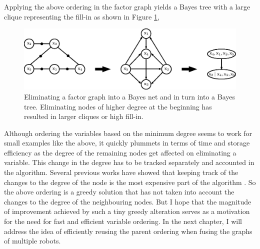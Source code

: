 Applying the above ordering in the factor graph yields a Bayes tree with a large clique representing the fill-in as shown in Figure \ref{fig:bad_ordering_graph},
\begin{figure}[H]
\centering
\includegraphics[width=\textwidth]{Chapters/figures2/bad_ordering}
\caption{Eliminating a factor graph into a Bayes net and in turn into a Bayes tree. Eliminating nodes of higher degree at the beginning has resulted in larger cliques or high fill-in.}
\label{fig:bad_ordering_graph}
\end{figure}

Although ordering the variables based on the minimum degree seems to work for small examples like the above, it quickly plummets in terms of time and storage efficiency as the degree of the remaining nodes get affected on eliminating a variable. This change in the degree has to be tracked separately and accounted in the algorithm. Several previous works have showed that keeping track of the changes to the degree of the node is the most expensive part of the algorithm \cite{dufftrackingexpensive, georgetrackingexpensive, eisenstattrackingexpensive}. So the above ordering is a greedy solution that has not taken into account the changes to the degree of the neighbouring nodes. But I hope that the magnitude of improvement achieved by such a tiny greedy alteration serves as a motivation for the need for fast and efficient variable ordering. In the next chapter, I will address the idea of efficiently reusing the parent ordering when fusing the graphs of multiple robots.



